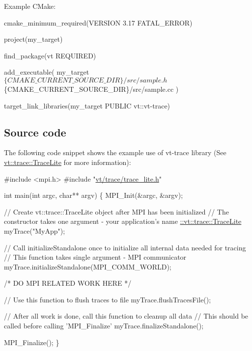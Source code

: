 Example C\+Make\+: 
\begin{DoxyCode}
cmake\_minimum\_required(VERSION 3.17 FATAL\_ERROR)

project(my\_target)

find\_package(vt REQUIRED)

add\_executable(
  my\_target
  $\{CMAKE\_CURRENT\_SOURCE\_DIR\}/src/sample.h
  $\{CMAKE\_CURRENT\_SOURCE\_DIR\}/src/sample.cc
)

target\_link\_libraries(my\_target PUBLIC vt::vt-trace)
\end{DoxyCode}


\subsection*{Source code}

The following code snippet shows the example use of vt-\/trace library (See {\ttfamily \hyperlink{structvt_1_1trace_1_1_trace_lite}{vt\+::trace\+::\+Trace\+Lite}} for more information)\+:


\begin{DoxyCode}
\textcolor{preprocessor}{#include <mpi.h>}
\textcolor{preprocessor}{#include "\hyperlink{trace__lite_8h}{vt/trace/trace\_lite.h}"}

\textcolor{keywordtype}{int} main(\textcolor{keywordtype}{int} argc, \textcolor{keywordtype}{char}** argv) \{
  MPI\_Init(&argc, &argv);

  \textcolor{comment}{// Create vt::trace::TraceLite object after MPI has been initialized}
  \textcolor{comment}{// The constructor takes one argument - your application's name}
  \hyperlink{structvt_1_1trace_1_1_trace_lite}{::vt::trace::TraceLite} myTrace(\textcolor{stringliteral}{"MyApp"});


  \textcolor{comment}{// Call initializeStandalone once to initialize all internal data needed for tracing}
  \textcolor{comment}{// This function takes single argument - MPI communicator}
  myTrace.initializeStandalone(MPI\_COMM\_WORLD);

  \textcolor{comment}{/*}
\textcolor{comment}{     DO MPI RELATED WORK HERE}
\textcolor{comment}{  */}

  \textcolor{comment}{// Use this function to flush traces to file}
  myTrace.flushTracesFile();

  \textcolor{comment}{// After all work is done, call this function to cleanup all data}
  \textcolor{comment}{// This should be called before calling 'MPI\_Finalize'}
  myTrace.finalizeStandalone();

  MPI\_Finalize();
\}
\end{DoxyCode}
 